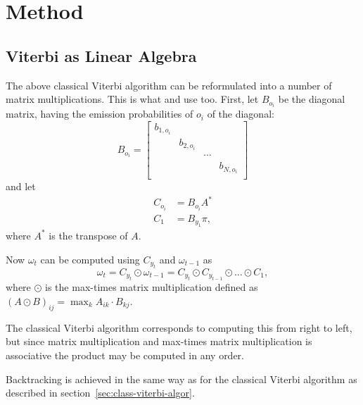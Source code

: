 \chapter{Method}
\label{cha:method}

\section{Viterbi as Linear Algebra}
\label{sec:algorithm-as-linear}

The above classical Viterbi algorithm can be reformulated into a number of
matrix multiplications. This is what \citet{sand2013ziphmmlib} and
\citet{lifshits2009speeding} use too. First, let $B_{o_i}$ be the diagonal
matrix, having the emission probabilities of $o_i$ of the diagonal:
\begin{equation*}
  B_{o_i} =
  \begin{bmatrix}
    b_{1, o_i} &            &        &            \\
               & b_{2, o_i} &        &            \\
               &            & \cdots &            \\
               &            &        & b_{N, o_i} \\
  \end{bmatrix}
\end{equation*}
and let
\begin{align*}
  C_{o_i} &= B_{o_i} A^* \\
  C_1 &= B_{y_1} \pi,
\end{align*}
where $A^*$ is the transpose of $A$.

Now $\omega_t$ can be computed using $C_{y_t}$ and $\omega_{t - 1}$ as
\begin{equation}
  \label{eq:2}
  \omega_t = C_{y_t} \odot \omega_{t - 1} = C_{y_t} \odot C_{y_{t-1}} \odot
  \dots \odot C_1,
\end{equation}
where $\odot$ is the max-times matrix multiplication defined as ${(A \odot
  B)}_{ij} = \max_k A_{ik} \cdot B_{kj}$.

The classical Viterbi algorithm corresponds to computing this from right to
left, but since matrix multiplication and max-times matrix multiplication is
associative the product may be computed in any order.

Backtracking is achieved in the same way as for the classical Viterbi algorithm
as described in section~\ref{sec:class-viterbi-algor}.

